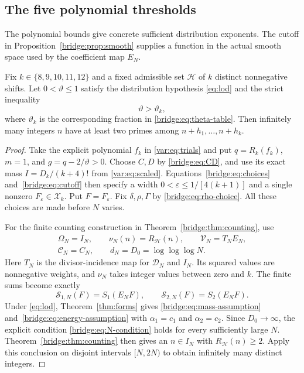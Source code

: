 \documentclass[11pt]{article}
\begin{document}
\subsection{The five polynomial thresholds}

The polynomial bounds give concrete sufficient distribution exponents.
The cutoff in Proposition~\ref{bridge:prop:smooth} supplies a function
in the actual smooth space used by the coefficient map $E_N$.

\begin{corollary}
Fix\label{bridge:cor:prime} $k\in\{8,9,10,11,12\}$ and a fixed admissible set
$\mathcal H$ of $k$ distinct nonnegative shifts.
Let $0<\vartheta\leq1$ satisfy the distribution hypothesis
\eqref{eq:lod} and the strict inequality
\[
                         \vartheta>\vartheta_k,
\]
where $\vartheta_k$ is the corresponding fraction in
\eqref{bridge:eq:theta-table}.
Then infinitely many integers $n$ have at least two primes among
$n+h_1,\ldots,n+h_k$.
\end{corollary}

\begin{proof}
Take the explicit polynomial $f_k$ in \eqref{var:eq:trials} and put
$q=R_k(f_k)$, $m=1$, and $g=q-2/\vartheta>0$.
Choose $C,D$ by \eqref{bridge:eq:CD}, and use its exact mass
$I=D_k/(k+4)!$ from \eqref{var:eq:scaled}.
Equations~\eqref{bridge:eq:choices} and~\eqref{bridge:eq:cutoff}
then specify a width $0<\varepsilon\leq1/[4(k+1)]$ and a single
nonzero $F_\varepsilon\in\mathcal X_k$.  Put $F=F_\varepsilon$.
Fix $\delta,\rho,\Gamma$ by \eqref{bridge:eq:rho-choice}.
All these choices are made before $N$ varies.

For the finite counting construction in Theorem~\ref{bridge:thm:counting},
use
\[
 \begin{gathered}
 \Omega_N=I_N,\qquad \nu_N(n)=R_{\mathcal H}(n),\qquad
 \mathcal V_N=T_NE_N,\\
 \mathcal C_N=C_N,\qquad d_N=D_0=\log\log\log N.
 \end{gathered}
\]
Here $T_N$ is the divisor-incidence map for $\mathcal D_N$ and $I_N$.
Its squared values are nonnegative weights, and $\nu_N$ takes integer
values between zero and $k$.
The finite sums become exactly
\[
 \mathscr S_{1,N}(F)=S_1(E_NF),\qquad
 \mathscr S_{2,N}(F)=S_2(E_NF).
\]
Under \eqref{eq:lod}, Theorem~\ref{thm:forms} gives
\eqref{bridge:eq:mass-assumption} and~\eqref{bridge:eq:energy-assumption}
with $\alpha_1=c_1$ and $\alpha_2=c_2$.
Since $D_0\to\infty$, the explicit condition
\eqref{bridge:eq:N-condition} holds for every sufficiently large $N$.
Theorem~\ref{bridge:thm:counting} then gives an $n\in I_N$ with
$R_{\mathcal H}(n)\geq2$.
Apply this conclusion on disjoint intervals $[N,2N)$ to obtain infinitely
many distinct integers.
\end{proof}
\end{document}
